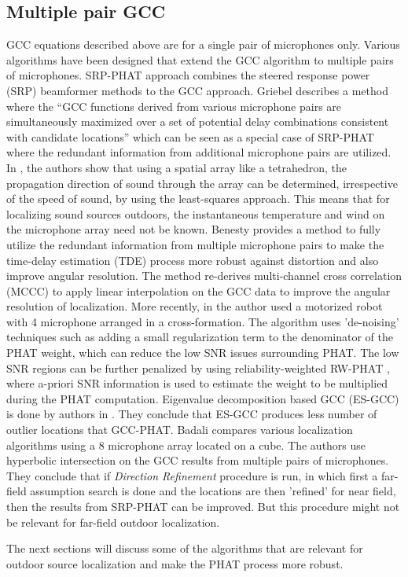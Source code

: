 \subsection{Multiple pair GCC}

GCC equations described above are for a single pair of microphones only. Various algorithms have been designed that extend the GCC algorithm to multiple pairs of microphones. SRP-PHAT approach \cite{dibiase2000high} combines the steered response power (SRP) beamformer methods \cite{krim1996two} to the GCC approach. Griebel \cite{griebel2001microphone} describes a method where the \enquote{GCC functions derived from various microphone pairs are simultaneously maximized over a set of potential delay combinations consistent with candidate locations} which can be seen as a special case of SRP-PHAT where the redundant information from additional microphone pairs are utilized. In \cite{okuyama2002study}, the authors show that using a spatial array like a tetrahedron, the propagation direction of sound through the array can be determined, irrespective of the speed of sound, by using the least-squares approach. This means that for localizing sound sources outdoors, the instantaneous temperature and wind on the microphone array need not be known. Benesty \cite{benesty2004time} provides a method to fully utilize the redundant information from multiple microphone pairs to make the time-delay estimation (TDE) process more robust against distortion and also improve angular resolution. The method re-derives multi-channel cross correlation (MCCC) to apply linear interpolation on the GCC data to improve the angular resolution of localization. More recently, in \cite{liu2010continuous} the author used a motorized robot with 4 microphone arranged in a cross-formation. The algorithm uses 'de-noising' techniques such as adding a small regularization term to the denominator of the PHAT weight, which can reduce the low SNR issues surrounding PHAT.
The low SNR regions can be further penalized by using reliability-weighted RW-PHAT \cite{valin2006robust}, where a-priori SNR information is used to estimate the weight to be multiplied during the PHAT computation. Eigenvalue decomposition based GCC (ES-GCC) is done by authors in \cite{hu2009estimation}. They conclude that ES-GCC produces less number of outlier locations that GCC-PHAT. Badali \cite{badali2009evaluating} compares various localization algorithms using a 8 microphone array located on a cube. The authors use hyperbolic intersection on the GCC results from multiple pairs of microphones. They conclude that if \textit{Direction Refinement} procedure is run, in which first a far-field assumption search is done and the locations are then 'refined' for near field, then the results from SRP-PHAT can be improved. But this procedure might not be relevant for far-field outdoor localization.  

The next sections will discuss some of the algorithms that are relevant for outdoor source localization and make the PHAT process more robust. 